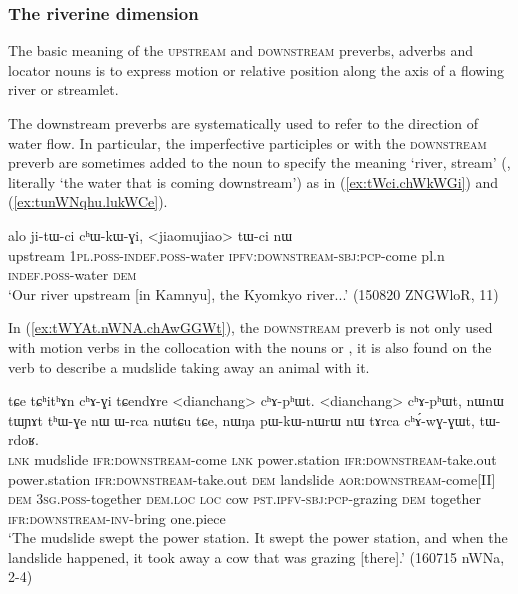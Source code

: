 \subsubsection{The riverine dimension} \label{sec:riverine.dimension}
The basic meaning of the \textsc{upstream} and \textsc{downstream} preverbs, adverbs and locator nouns is to express motion or relative position along the axis of a flowing river or streamlet.

The downstream preverbs are systematically used to refer to the direction of water flow. In particular, the imperfective participles  or  with the \textsc{downstream} preverb are sometimes added to the noun  to specify the meaning `river, stream' (, literally `the water that is coming downstream') as in (\ref{ex:tWci.chWkWGi}) and (\ref{ex:tunWNqhu.lukWCe}).

 \begin{exe}
\ex \label{ex:tWci.chWkWGi}
\gll  alo ji-tɯ-ci cʰɯ-kɯ-ɣi, <jiaomujiao> tɯ-ci nɯ    \\
 upstream \textsc{1pl}.\textsc{poss}-\textsc{indef}.\textsc{poss}-water \textsc{ipfv}:\textsc{downstream}-\textsc{sbj}:\textsc{pcp}-come pl.n \textsc{indef}.\textsc{poss}-water \textsc{dem} \\
\glt `Our river upstream [in Kamnyu], the Kyomkyo river...' (150820 ZNGWloR, 11)
\end{exe}

In (\ref{ex:tWYAt.nWNA.chAwGGWt}), the \textsc{downstream} preverb is not only used with motion verbs in the collocation with the nouns  or , it is also found on the verb  to describe a mudslide taking away an animal with it.

 \begin{exe}
\ex \label{ex:tWYAt.nWNA.chAwGGWt}
\gll  tɕe tɕʰitʰɤn cʰɤ-ɣi tɕendɤre <dianchang> cʰɤ-pʰɯt. <dianchang> cʰɤ-pʰɯt, nɯnɯ tɯɲɤt tʰɯ-ɣe nɯ ɯ-rca nɯtɕu tɕe, 
nɯŋa pɯ-kɯ-nɯrɯ nɯ tɤrca cʰɤ́-wɣ-ɣɯt, tɯ-rdoʁ. \\
\textsc{lnk} mudslide \textsc{ifr}:\textsc{downstream}-come \textsc{lnk} power.station \textsc{ifr}:\textsc{downstream}-take.out power.station \textsc{ifr}:\textsc{downstream}-take.out \textsc{dem} landslide \textsc{aor}:\textsc{downstream}-come[II] \textsc{dem} \textsc{3sg}.\textsc{poss}-together \textsc{dem}.\textsc{loc} \textsc{loc} cow \textsc{pst}.\textsc{ipfv}-\textsc{sbj}:\textsc{pcp}-grazing \textsc{dem} together \textsc{ifr}:\textsc{downstream}-\textsc{inv}-bring one.piece \\
\glt `The mudslide swept the power station. It swept the power station, and when the landslide happened, it took away a cow that was grazing [there].' (160715 nWNa, 2-4)
\end{exe}

